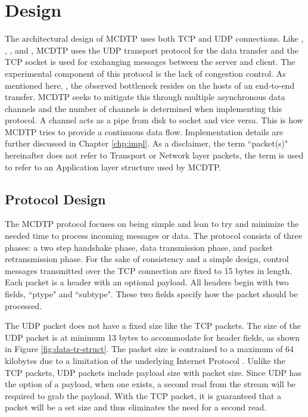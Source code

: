 \chapter{Design}

The architectural design of MCDTP uses both TCP and UDP connections. Like \cite{He2002}, \cite{Fan2010}, \cite{Aspera2016}, and \cite{Meiss2007}, MCDTP uses the UDP transport protocol for the data transfer and the TCP socket is used for exchanging messages between the server and client. The experimental component of this protocol is the lack of congestion control. As mentioned here, \cite{Fan2010} \cite{Aspera2016}, the observed bottleneck resides on the hosts of an end-to-end transfer. MCDTP seeks to mitigate this through multiple asynchronous data channels and the number of channels is determined when implementing this protocol. A channel acts as a pipe from disk to socket and vice versa. This is how MCDTP tries to provide a continuous data flow. Implementation details are further discussed in Chapter \ref{chp:impl}. As a disclaimer, the term ``packet(s)" hereinafter does not refer to Transport or Network layer packets, the term is used to refer to an Application layer structure used by MCDTP.

\section{Protocol Design}\label{sec:proto-des}

The MCDTP protocol focuses on being simple and lean to try and minimize the needed time to process incoming messages or data. The protocol consists of three phases: a two step handshake phase, data transmission phase, and packet retransmission phase. For the sake of consistency and a simple design, control messages transmitted over the TCP connection are fixed to 15 bytes in length. Each packet is a header with an optional payload. All headers begin with two fields, ``ptype" and ``subtype". These two fields specify how the packet should be processed.

The UDP packet does not have a fixed size like the TCP packets. The size of the UDP packet is at minimum 13 bytes to accommodate for header fields, as shown in Figure \ref{fig:data-tr-struct}. The packet size is contrained to a maximum of 64 kilobytes due to a limitation of the underlying Internet Protocol \cite{postel1981ip}. Unlike the TCP packets, UDP packets include payload size with packet size. Since UDP has the option of a payload, when one exists, a second read from the stream will be required to grab the payload. With the TCP packet, it is guaranteed that a packet will be a set size and thus eliminates the need for a second read.

